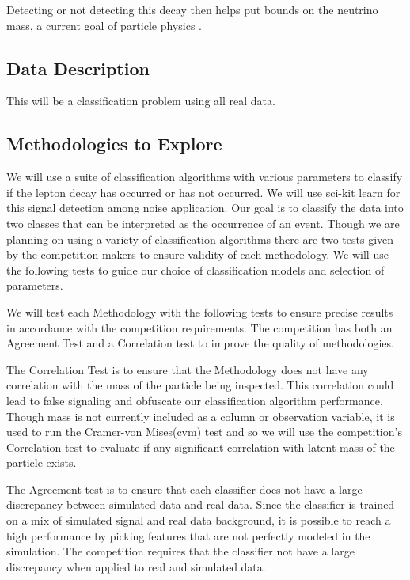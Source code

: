 \documentclass{article} %
\begin{document}
Detecting or not detecting this decay then helps put bounds on the neutrino mass, a current goal of particle physics \cite{lhcb15}.

\subsection*{Data Description}

This will be a classification problem using all real data.

\subsection*{Methodologies to Explore}
We will use a suite of classification algorithms with various parameters to classify if the lepton decay has occurred or has not occurred. We will use sci-kit learn for this signal detection among noise application. Our goal is  to classify the data into two classes that can be interpreted as the occurrence of an event. Though we are planning on using a variety of classification algorithms there are two tests given by the competition makers to ensure validity of each methodology. We will use the following tests to guide our choice of classification models and selection of  parameters.

We will test each Methodology with the following tests to ensure precise results in accordance with the competition requirements. The competition has both an Agreement Test and a Correlation test to improve the quality of methodologies.

The Correlation Test is to ensure that the Methodology does not have any correlation with the mass of the particle being inspected. This correlation could lead to false signaling and obfuscate our classification algorithm performance. Though mass is not currently included as a column or observation variable, it is used to run the Cramer-von Mises(cvm) test and so we will use the competition's Correlation test to evaluate if any significant correlation with latent mass of the particle exists.

The Agreement test is to ensure that each classifier does not have a large discrepancy between simulated data and real data. Since the classifier is trained on a mix of simulated signal and real data background, it is possible to reach a high performance by picking features that are not perfectly modeled in the simulation. The competition requires that the classifier not have a large discrepancy when applied to real and simulated data. \cite{kaggleComp}
\end{document}
